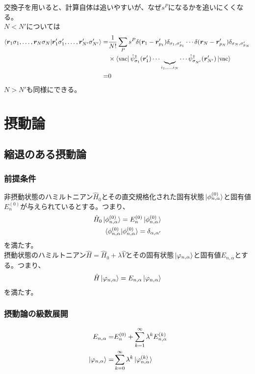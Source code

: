 \documentclass{ltjsarticle}
\begin{document}
交換子を用いると、計算自体は追いやすいが、なぜ$s^P$になるかを追いにくくなる。\\
$N<N'$については
\begin{align}
  \braket{\bm{r}_1\sigma_1,\dots,\bm{r}_N\sigma_N}{\bm{r}'_1\sigma'_1,\dots,\bm{r}'_{N'}\sigma'_{N'}}
  =&\frac{1}{N!}\sum_P s^P\delta(\bm{r}_1-\bm{r}'_{p_1})\delta_{\sigma_1,\sigma'_{p_1}}\cdots\delta(\bm{r}_N-\bm{r}'_{p_N})\delta_{\sigma_N,\sigma'_{p_N}}\\
  &\times\bra{\rm{vac}}\hat{\psi}_{\sigma_1}^\dag (\bm{r}'_1)\cdots\underbrace{}_{i_1,\dots,i_N}\cdots\hat{\psi}_{\sigma_{N'}}^\dag (\bm{r}'_{N'})\ket{\rm{vac}}\\
  =&0
\end{align}
$N>N'$も同様にできる。\\
\section{摂動論}
\subsection{縮退のある摂動論}
\subsubsection{前提条件}
非摂動状態のハミルトニアン$\hat{H}_0$とその直交規格化された固有状態$\ket*{\phi^{(0)}_{n,\alpha}}$と固有値$E^{(0)}_{n}$が与えられているとする。つまり、
\begin{align}
  \hat{H}_0\ket*{\phi^{(0)}_{n,\alpha}}=E^{(0)}_{n}\ket*{\phi^{(0)}_{n,\alpha}}\\
  \braket*{\phi^{(0)}_{n,\alpha}}{\phi^{(0)}_{n,\alpha}}=\delta_{\alpha,\alpha'}
\end{align}
を満たす。\\
摂動状態のハミルトニアン$\hat{H}=\hat{H}_0+\lambda\hat{V}$とその固有状態$\ket*{\varphi_{n,\alpha}}$と固有値$E_{n,\alpha}$とする。つまり、
\begin{align}
  \hat{H}\ket*{\varphi_{n,\alpha}}=E_{n,\alpha}\ket*{\varphi_{n,\alpha}}
  \label{eq:perturbation_schrodinger_equation}
\end{align}
を満たす。\\
\subsubsection{摂動論の級数展開}
\begin{align}
  E_{n,\alpha}=&E_n^{(0)}+\sum_{k=1}^{\infty}\lambda^kE^{(k)}_{n,\alpha}\\
  \ket*{\varphi_{n,\alpha}}=&\sum_{k=0}^{\infty}\lambda^k\ket*{\varphi^{(k)}_{n,\alpha}}
\end{align}
\end{document}

